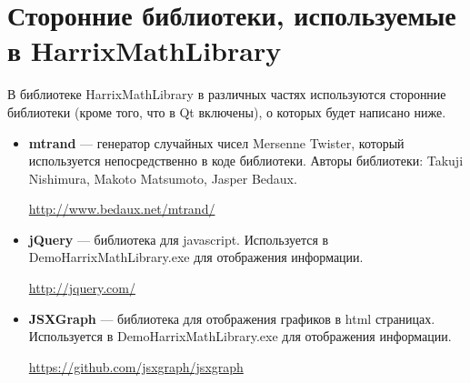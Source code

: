 \newpage
\section{Сторонние библиотеки, используемые в HarrixMathLibrary}\label{section_thirdparty}

В библиотеке HarrixMathLibrary в различных частях используются сторонние библиотеки (кроме того, что в Qt включены), о которых будет написано ниже.

\begin{itemize}
\item \textbf{mtrand} --- генератор случайных чисел Mersenne Twister, который используется непосредственно в коде библиотеки. Авторы библиотеки: Takuji Nishimura, Makoto Matsumoto, Jasper Bedaux.

\href {http://www.bedaux.net/mtrand/} {http://www.bedaux.net/mtrand/}

\item \textbf{jQuery} --- библиотека для javascript. Используется в DemoHarrixMathLibrary.exe для отображения информации.

\href {http://jquery.com/} {http://jquery.com/}

\item \textbf{JSXGraph} --- библиотека для отображения графиков  в html страницах. Используется в DemoHarrixMathLibrary.exe для отображения информации.

\href {https://github.com/jsxgraph/jsxgraph} {https://github.com/jsxgraph/jsxgraph}
\end{itemize}